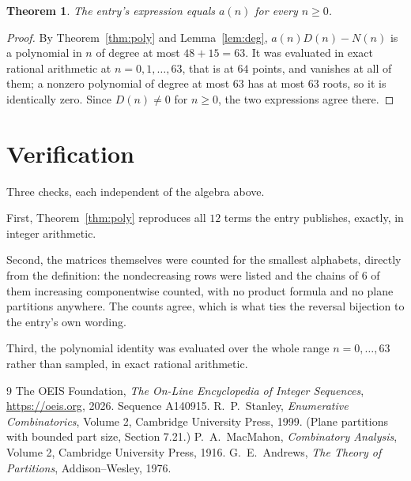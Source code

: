 \documentclass[11pt,a4paper]{article}
\theoremstyle{plain}
\newtheorem{theorem}{Theorem}
\theoremstyle{definition}
\begin{document}
\begin{theorem}
The entry's expression equals $a(n)$ for every $n\ge0$.
\end{theorem}

\begin{proof}
By Theorem~\ref{thm:poly} and Lemma~\ref{lem:deg}, $a(n)D(n)-N(n)$ is a polynomial in $n$
of degree at most $48+15=63$. It was evaluated in exact rational arithmetic at
$n=0,1,\dots,63$, that is at $64$ points, and vanishes at all of them; a nonzero polynomial
of degree at most $63$ has at most $63$ roots, so it is identically zero. Since $D(n)\neq0$
for $n\ge0$, the two expressions agree there.
\end{proof}

\section{Verification}

Three checks, each independent of the algebra above.

First, Theorem~\ref{thm:poly} reproduces all $12$ terms the entry publishes,
exactly, in integer arithmetic.

Second, the matrices themselves were counted for the smallest alphabets, directly from the
definition: the nondecreasing rows were listed and the chains of $6$ of them increasing
componentwise counted, with no product formula and no plane partitions anywhere. The counts
agree, which is what ties the reversal bijection to the entry's own wording.

Third, the polynomial identity was evaluated over the whole range $n=0,\dots,63$ rather than
sampled, in exact rational arithmetic.

\begin{thebibliography}{9}
 The OEIS Foundation, \emph{The On-Line Encyclopedia of Integer
Sequences}, \url{https://oeis.org}, 2026. Sequence A140915.
 R.~P.~Stanley, \emph{Enumerative Combinatorics}, Volume 2, Cambridge
University Press, 1999. (Plane partitions with bounded part size, Section 7.21.)
 P.~A.~MacMahon, \emph{Combinatory Analysis}, Volume 2, Cambridge
University Press, 1916.
 G.~E.~Andrews, \emph{The Theory of Partitions}, Addison--Wesley, 1976.
\end{thebibliography}
\end{document}
